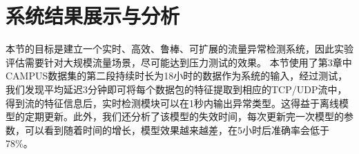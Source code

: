 \section{系统结果展示与分析}
本节的目标是建立一个实时、高效、鲁棒、可扩展的流量异常检测系统，因此实验评估需要针对大规模流量场景，尽可能达到压力测试的效果。
本节使用了第3章中CAMPUS数据集的第二段持续时长为18小时的数据作为系统的输入，经过测试，我们发现平均延迟3分钟即可将每个数据包的特征提取到相应的TCP/UDP流中，得到流的特征信息后，实时检测模块可以在1秒内输出异常类型。这得益于离线模型的定期更新。此外，我们还分析了该模型的失效时间，每次更新完一次模型的参数，可以看到随着时间的增长，模型效果越来越差，在5小时后准确率会低于78\%。